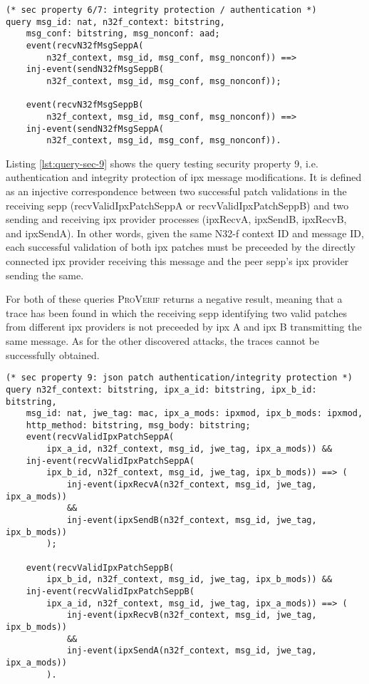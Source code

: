 \begin{lstlisting}[caption={Query for security property 6 and 7},label={lst:query-sec-6},firstnumber=416]
(* sec property 6/7: integrity protection / authentication *)
query msg_id: nat, n32f_context: bitstring,
    msg_conf: bitstring, msg_nonconf: aad;
    event(recvN32fMsgSeppA(
        n32f_context, msg_id, msg_conf, msg_nonconf)) ==>
    inj-event(sendN32fMsgSeppB(
        n32f_context, msg_id, msg_conf, msg_nonconf));

    event(recvN32fMsgSeppB(
        n32f_context, msg_id, msg_conf, msg_nonconf)) ==>
    inj-event(sendN32fMsgSeppA(
        n32f_context, msg_id, msg_conf, msg_nonconf)).
\end{lstlisting}

Listing \ref{lst:query-sec-9} shows the query testing security property 9, i.e. authentication and integrity protection of \gls{ipx} message modifications.
It is defined as an injective correspondence between two successful patch validations in the receiving \gls{sepp} ({\sffamily recvValidIpxPatchSeppA} or {\sffamily recvValidIpxPatchSeppB}) and two sending and receiving \gls{ipx} provider processes ({\sffamily ipxRecvA}, {\sffamily ipxSendB}, {\sffamily ipxRecvB}, and {\sffamily ipxSendA}).
In other words, given the same N32-f context ID and message ID, each successful validation of both \gls{ipx} patches must be preceeded by the directly connected \gls{ipx} provider receiving this message and the peer \gls{sepp}'s \gls{ipx} provider sending the same.

For both of these queries \textsc{ProVerif} returns a negative result, meaning that a trace has been found in which the receiving \gls{sepp} identifying two valid patches from different \gls{ipx} providers is not preceeded by \gls{ipx} A and \gls{ipx} B transmitting the same message.
As for the other discovered attacks, the traces cannot be successfully obtained.

\begin{lstlisting}[caption={Query for security property 9},label={lst:query-sec-9},firstnumber=394]
(* sec property 9: json patch authentication/integrity protection *)
query n32f_context: bitstring, ipx_a_id: bitstring, ipx_b_id: bitstring,
    msg_id: nat, jwe_tag: mac, ipx_a_mods: ipxmod, ipx_b_mods: ipxmod,
    http_method: bitstring, msg_body: bitstring;
    event(recvValidIpxPatchSeppA(
        ipx_a_id, n32f_context, msg_id, jwe_tag, ipx_a_mods)) &&
    inj-event(recvValidIpxPatchSeppA(
        ipx_b_id, n32f_context, msg_id, jwe_tag, ipx_b_mods)) ==> (
            inj-event(ipxRecvA(n32f_context, msg_id, jwe_tag, ipx_a_mods))
            &&
            inj-event(ipxSendB(n32f_context, msg_id, jwe_tag, ipx_b_mods))
        );

    event(recvValidIpxPatchSeppB(
        ipx_b_id, n32f_context, msg_id, jwe_tag, ipx_b_mods)) &&
    inj-event(recvValidIpxPatchSeppB(
        ipx_a_id, n32f_context, msg_id, jwe_tag, ipx_a_mods)) ==> (
            inj-event(ipxRecvB(n32f_context, msg_id, jwe_tag, ipx_b_mods))
            &&
            inj-event(ipxSendA(n32f_context, msg_id, jwe_tag, ipx_a_mods))
        ).
\end{lstlisting}


